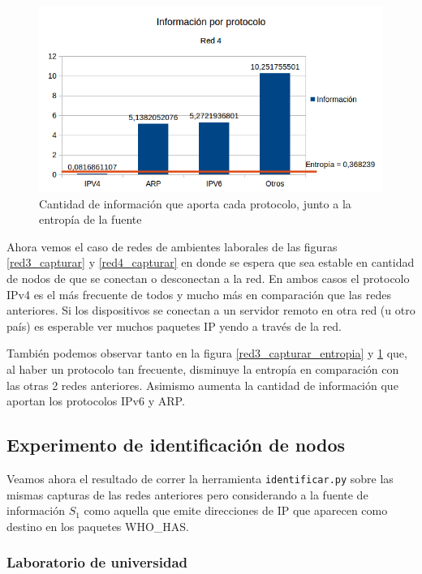 \begin{figure}[H]
	\centering
	\includegraphics[scale=0.65]{imgs/red4_capturar_entropia.png}
	\caption{Cantidad de información que aporta cada protocolo, junto a la entropía de la fuente}
      \label{red4_capturar_entropia}
\end{figure}

Ahora vemos el caso de redes de ambientes laborales de las figuras \ref{red3_capturar} y \ref{red4_capturar} en donde se espera que sea estable en cantidad de nodos de que se conectan o desconectan a la red. En ambos casos el protocolo IPv4 es el más frecuente de todos y mucho más en comparación que las redes anteriores. Si los dispositivos se conectan a un servidor remoto en otra red (u otro país) es esperable ver muchos paquetes IP yendo a través de la red. 

También podemos observar tanto en la figura \ref{red3_capturar_entropia} y \ref{red4_capturar_entropia} que, al haber un protocolo tan frecuente, disminuye la entropía en comparación con las otras 2 redes anteriores. Asimismo aumenta la cantidad de información que aportan los protocolos IPv6 y ARP.


\newpage
\subsection{Experimento de identificación de nodos}

Veamos ahora el resultado de correr la herramienta \texttt{identificar.py} sobre las mismas capturas de las redes anteriores pero considerando a la fuente de información $S_1$ como aquella que emite direcciones de IP que aparecen como destino en los paquetes WHO\_HAS.

\subsubsection{Laboratorio de universidad}

